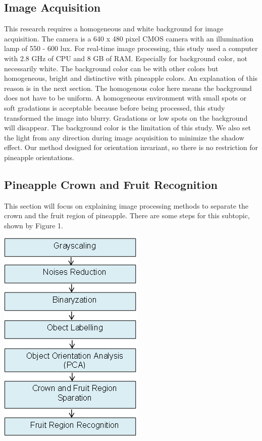 \documentclass[11pt]{article}
\begin{document}
\begin{linenumbers}
\subsection{Image Acquisition }
This research requires a homogeneous and white background for image acquisition. The camera is a 640 x 480 pixel CMOS camera with an illumination lamp of 550 - 600 lux. For real-time image processing, this study used a computer with 2.8 GHz of CPU and 8 GB of RAM. Especially for background color, not necessarily white. The background color can be with other colors but homogeneous, bright and distinctive with pineapple colors. An explanation of this reason is in the next section. The homogenous color here means the background does not have to be uniform. A homogeneous environment with small spots or soft gradations is acceptable because before being processed, this study transformed the image into blurry. Gradations or low spots on the background will disappear. The background color is the limitation of this study.  We also set the light from any direction during image acquisition to minimize the shadow effect. Our method designed for orientation invariant, so there is no restriction for pineapple orientations.

\subsection{Pineapple Crown and Fruit Recognition}
This section will focus on explaining image processing methods to separate the crown and the fruit region of pineapple. There are some steps for this subtopic, shown by {Figure 1}. 
\begin{center}
	\includegraphics[scale=0.73]{images/flowchart}
\end{center}


\end{linenumbers}
\end{document}
